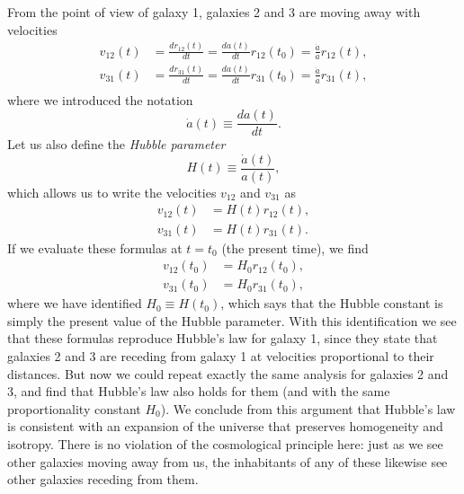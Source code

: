 \documentclass[11pt, a4paper,oneside,openright]{book}
\numberwithin{equation}{section}
\begin{document}
From the point of view of galaxy 1, galaxies 2 and 3 are moving away with velocities
\begin{equation}
\begin{split}
v_{12}(t)&=\frac{dr_{12}(t)}{dt}=\frac{da(t)}{dt}r_{12}(t_0)=\frac{\dot{a}}{a}r_{12}(t),\\
v_{31}(t)&=\frac{dr_{31}(t)}{dt}=\frac{da(t)}{dt}r_{31}(t_0)=\frac{\dot{a}}{a}r_{31}(t),\\
\end{split}
\end{equation}
where we introduced the notation
\begin{equation}
\dot{a}(t)\equiv \frac{da(t)}{dt}.
\end{equation}
Let us also define the {\it Hubble parameter}
\begin{equation}
H(t)\equiv \frac{\dot{a}(t)}{a(t)},
\end{equation}
which allows us to write the velocities $v_{12}$ and $v_{31}$ as
\begin{equation}
\begin{split}
v_{12}(t)&=H(t)r_{12}(t),\\
v_{31}(t)&=H(t)r_{31}(t).
\end{split}
\end{equation}
If we evaluate these formulas at $t=t_0$ (the present time), we find
\begin{equation}
\begin{split}
v_{12}(t_0)&=H_0 r_{12}(t_0),\\
v_{31}(t_0)&=H_0 r_{31}(t_0),
\end{split}
\end{equation}
where we have identified $H_0\equiv H(t_0)$, which says that the Hubble constant is simply the present value of the Hubble parameter. With this identification we see that these formulas reproduce Hubble's law for galaxy 1, since they state that galaxies 2 and 3 are receding from galaxy 1 at velocities proportional to their distances. But now we could repeat exactly the same analysis for galaxies 2 and 3, and find that Hubble's law also holds for them (and with the same proportionality constant $H_0$). We conclude from this argument that Hubble's law is consistent with an expansion of the universe that preserves homogeneity and isotropy. There is no violation of the cosmological principle here: just as we see other galaxies moving away from us, the inhabitants of any of these likewise see other galaxies receding from them.
\end{document}
